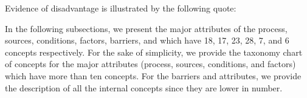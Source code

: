 Evidence of disadvantage is illustrated by the following quote:
 
In the following subsections, we present the major attributes of the {\model} process, sources, conditions, factors, barriers, and {\principle} which have 18, 17, 23, 28, 7, and 6 concepts respectively. For the sake of simplicity, we provide the taxonomy chart of concepts for the major attributes (process, sources, conditions, and factors) which have more than ten concepts. For the barriers and {\principle} attributes, we provide the description of all the internal concepts since they are lower in number. 


























